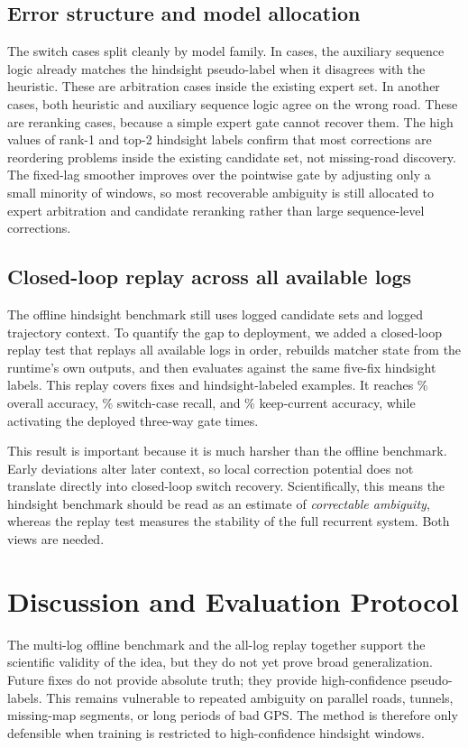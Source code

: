 \documentclass{article}
\begin{document}
\subsection{Error structure and model allocation}
The switch cases split cleanly by model family. In \ChangedMiniRecoverCount{} cases, the auxiliary sequence logic already matches the hindsight pseudo-label when it disagrees with the heuristic. These are arbitration cases inside the existing expert set. In another \ChangedBothAgreeMissCount{} cases, both heuristic and auxiliary sequence logic agree on the wrong road. These are reranking cases, because a simple expert gate cannot recover them. The high values of \ChangedPseudoTopOneCount{} rank-1 and \ChangedPseudoTopTwoCount{} top-2 hindsight labels confirm that most corrections are reordering problems inside the existing candidate set, not missing-road discovery. The fixed-lag smoother improves over the pointwise gate by adjusting only a small minority of windows, so most recoverable ambiguity is still allocated to expert arbitration and candidate reranking rather than large sequence-level corrections.

\subsection{Closed-loop replay across all available logs}
The offline hindsight benchmark still uses logged candidate sets and logged trajectory context. To quantify the gap to deployment, we added a closed-loop replay test that replays all \ReplayAllLogs{} available logs in order, rebuilds matcher state from the runtime's own outputs, and then evaluates against the same five-fix hindsight labels. This replay covers \ReplayAllLogFixes{} fixes and \ReplayPseudoExamples{} hindsight-labeled examples. It reaches \ReplayAccuracy{}\% overall accuracy, \ReplayChangedRecall{}\% switch-case recall, and \ReplayUnchangedAccuracy{}\% keep-current accuracy, while activating the deployed three-way gate \ReplayThreeWayGateActivations{} times.

This result is important because it is much harsher than the offline benchmark. Early deviations alter later context, so local correction potential does not translate directly into closed-loop switch recovery. Scientifically, this means the hindsight benchmark should be read as an estimate of \emph{correctable ambiguity}, whereas the replay test measures the stability of the full recurrent system. Both views are needed.

\section{Discussion and Evaluation Protocol}
The multi-log offline benchmark and the all-log replay together support the scientific validity of the idea, but they do not yet prove broad generalization. Future fixes do not provide absolute truth; they provide high-confidence pseudo-labels. This remains vulnerable to repeated ambiguity on parallel roads, tunnels, missing-map segments, or long periods of bad GPS. The method is therefore only defensible when training is restricted to high-confidence hindsight windows.
\end{document}
